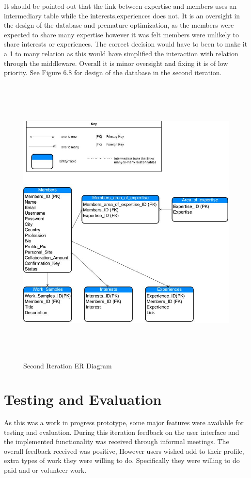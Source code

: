 \documentclass[a4paper,oneside,11pt]{report}
\begin{document}
It should be pointed out that the link between expertise and members uses an intermediary table while the interests,experiences does not. It is an oversight in the design of the database and premature optimization, as the members were expected to share many expertise however it was felt members were unlikely to share interests or experiences. The correct decision would have to been to make it a 1 to many relation as this would have simplified the interaction with relation through the middleware. Overall it is minor oversight and fixing it is of low priority. See Figure 6.8 for design of the database in the second iteration.
\pagebreak			
\begin{figure}[!ht]
\centering
\includegraphics[width=\textwidth,height=15cm]{second-iteration-er-diagram.jpg}
\caption{Second Iteration ER Diagram}
\end{figure}
\section{Testing and Evaluation}
As this was a work in progress prototype, some major features were available for testing and evaluation. During this iteration feedback on the user interface and the implemented functionality was received through informal meetings. The overall feedback received was positive, However users wished add to their profile, extra types of work they were willing to do. Specifically they were willing to do paid and or volunteer work.
\end{document}
